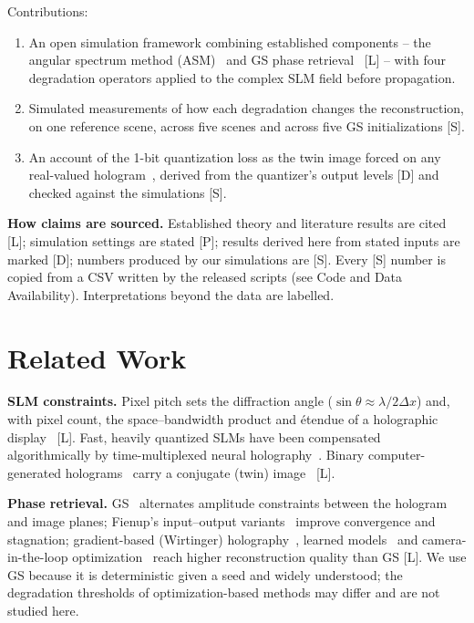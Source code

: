 \documentclass[conference]{IEEEtran}
\begin{document}
Contributions:
\begin{enumerate}
\item An open simulation framework combining established components -- the
      angular spectrum method (ASM)~\cite{goodman2005introduction} and GS phase
      retrieval~\cite{gerchberg1972practical} [L] -- with four degradation
      operators applied to the complex SLM field before propagation.
\item Simulated measurements of how each degradation changes the
      reconstruction, on one reference scene, across five scenes and across
      five GS initializations [S].
\item An account of the 1-bit quantization loss as the twin image forced on
      any real-valued hologram~\cite{gabor1948new}, derived from the
      quantizer's output levels [D] and checked against the simulations [S].
\end{enumerate}

\textbf{How claims are sourced.} Established theory and literature results
are cited [L]; simulation settings are stated [P]; results derived here from
stated inputs are marked [D]; numbers produced by our simulations are [S].
Every [S] number is copied from a CSV written by the released scripts (see
Code and Data Availability). Interpretations beyond the data are labelled.

\section{Related Work}
\label{sec:related}
\textbf{SLM constraints.} Pixel pitch sets the diffraction angle
($\sin\theta\approx\lambda/2\Delta x$) and, with pixel count, the
space--bandwidth product and \'etendue of a holographic display~\cite{holoeye2023slm}
[L]. Fast, heavily quantized SLMs have been compensated algorithmically by
time-multiplexed neural holography~\cite{choi2022time}. Binary
computer-generated holograms~\cite{brown1966complex,lee1978computer} carry a
conjugate (twin) image~\cite{gabor1948new} [L].

\textbf{Phase retrieval.} GS~\cite{gerchberg1972practical} alternates
amplitude constraints between the hologram and image planes; Fienup's
input--output variants~\cite{fienup1982phase} improve convergence and
stagnation; gradient-based (Wirtinger) holography~\cite{chakravarthula2019wirtinger},
learned models~\cite{shi2021towards} and camera-in-the-loop
optimization~\cite{peng2020neural} reach higher reconstruction quality than GS
[L]. We use GS because it is deterministic given a seed and widely
understood; the degradation thresholds of optimization-based methods may
differ and are not studied here.
\end{document}
